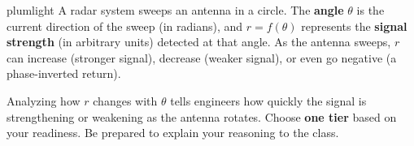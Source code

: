 \documentclass[10pt]{article}
\begin{document}
\namepartnerperiod

\vspace{0.10in}

\begin{scenariobox}{plumlight}
A radar system sweeps an antenna in a circle. The \textbf{angle} $\theta$ is the
current direction of the sweep (in radians), and $r = f(\theta)$ represents the
\textbf{signal strength} (in arbitrary units) detected at that angle. As the antenna
sweeps, $r$ can increase (stronger signal), decrease (weaker signal), or even
go negative (a phase-inverted return).

Analyzing how $r$ changes with $\theta$ tells engineers how quickly the signal
is strengthening or weakening as the antenna rotates. Choose \textbf{one tier}
based on your readiness. Be prepared to explain your reasoning to the class.
\end{scenariobox}

\vspace{0.08in}
\end{document}

